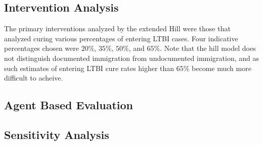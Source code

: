 \documentclass{amsart}
\begin{document}
\subsection{Intervention Analysis}
The primary interventions analyzed by the extended Hill were those that analyzed
curing various percentages of entering LTBI cases. Four indicative percentages
chosen were $20\%$, $35\%$, $50\%$, and $65\%$. Note that the hill model does
not distinguish documented immigration from undocumented immigration, and as
such estimates of entering LTBI cure rates higher than $65\%$ become much more
difficult to acheive. 

\subsection{Agent Based Evaluation}
\subsection{Sensitivity Analysis}
\end{document}
